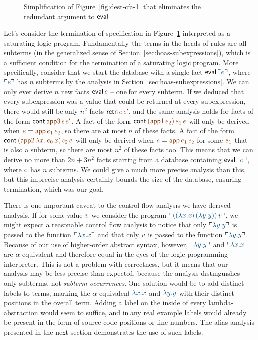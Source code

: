 \begin{figure}[t]
\caption{Simplification of Figure~\ref{fig:dest-cfa-1} that
  eliminates the redundant argument to ${\sf eval}$}
\label{fig:dest-cfa-2}
\end{figure}

Let's consider the termination of specification in
Figure~\ref{fig:dest-cfa-2} interpreted as a saturating logic program.
Fundamentally, the terms in the heads of rules are all subterms (in
the generalized sense of Section~\ref{sec:hoas-subexpressions}), which
is a sufficient condition for the termination of a saturating logic
program. More specifically, consider that we start the database with a
single fact ${\sf eval}\,\interp{e}$, where $\interp{e}$ has $n$
subterms by the analysis in Section~\ref{sec:hoas-subexpressions}.  We
can only ever derive $n$ new facts ${\sf eval}\,\lf{e}$ -- one for
every subterm. If we deduced that every subexpression was a value that
could be returned at every subexpression, there would still be only
$n^2$ facts ${\sf retn}\,\lf{e}\,\lf{e'}$, and the same analysis holds
for facts of the form ${\sf cont}\,\lf{\sf app3}\,\lf{e}\,\lf{e'}$.  A
fact of the form ${\sf cont}\,\lf{({\sf
    app1}\,e_2)}\,\lf{e_1}\,\lf{e}$ will only be derived when $\lf{e}
= \lf{{\sf app}\,e_1\,e_2}$, so there are at most $n$ of these
facts. A fact of the form ${\sf cont}\,\lf{({\sf app2}\,\lambda
  x.\,e_0\,x)}\,\lf{e_2}\,\lf{e}$ will only be derived when $\lf{e} =
\lf{{\sf app}\,\lf{e_1}\,\lf{e_2}}$ for some $\lf{e_1}$ that is also a
subterm, so there are most $n^2$ of these facts too. This means that
we can derive no more than $2n + 3n^2$ facts starting from a database
containing ${\sf eval}\,\interp{e}$, where $\obj{e}$ has $n$ subterms.
We could give a much more precise analysis than this, but this
imprecise analysis certainly bounds the size of the database, ensuring
termination, which was our goal.

There is one important caveat to the control flow analysis we have derived 
analysis. If for some value
$\obj{v}$ we consider the program $\interp{((\lambda x.x)\,(\lambda
  y.y))\,v}$, we might expect a reasonable control flow analysis to
notice that only $\interp{\lambda y.y}$ is passed to the function
$\interp{\lambda x.x}$ and that only $\obj{v}$ is passed to the
function $\interp{\lambda y.y}$. Because of our use of higher-order
abstract syntax, however, $\interp{\lambda y.y}$ and $\interp{\lambda
  x.x}$ are $\alpha$-equivalent and therefore equal in the eyes of the
logic programming interpreter. This is not a problem with correctness,
but it means that our analysis may be less precise than expected,
because the analysis distinguishes only subterms, not {\it subterm
  occurrences}. One solution would be to add distinct labels to terms,
marking the $\alpha$-equivalent $\obj{\lambda x.x}$ and $\obj{\lambda
  y.y}$ with their distinct positions in the overall term. Adding a
label on the inside of every lambda-abstraction would seem to suffice,
and in any real example labels would already be present in the form of
source-code positions or line numbers. The alias analysis presented in
the next section demonstrates the use of such labels.

